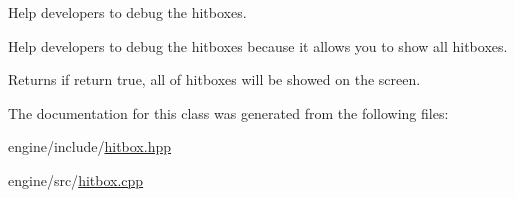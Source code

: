 Help developers to debug the hitboxes. 

Help developers to debug the hitboxes because it allows you to show all hitboxes.

\begin{DoxyReturn}{Returns}
if return true, all of hitboxes will be showed on the screen. 
\end{DoxyReturn}


The documentation for this class was generated from the following files\+:\begin{DoxyCompactItemize}
\item 
engine/include/\hyperlink{hitbox_8hpp}{hitbox.\+hpp}\item 
engine/src/\hyperlink{hitbox_8cpp}{hitbox.\+cpp}\end{DoxyCompactItemize}
